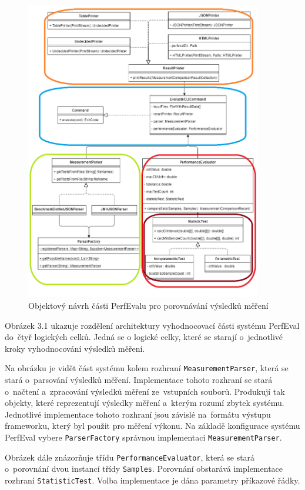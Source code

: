 \begin{figure}[!ht]
    \centering
    \includegraphics[width=0.92\textwidth]{../img/perfeval_evaluate_rect.png}
    \caption{Objektový návrh části PerfEvalu pro porovnávání výsledků měření}
\end{figure}

Obrázek 3.1 ukazuje rozdělení architektury vyhodnocovací části systému PerfEval do~čtyř logických celků.
Jedná se o logické celky, které se starají o~jednotlivé kroky vyhodnocování výsledků měření.

Na obrázku je vidět část systému kolem rozhraní \lstinline|MeasurementParser|, která se stará o~parsování výsledků měření.
Implementace tohoto rozhraní se stará o~načtení a~zpracování výsledků měření ze~vstupních souborů.
Produkují tak objekty, které reprezentují výsledky měření a~kterým rozumí zbytek systému.
Jednotlivé implementace tohoto rozhraní jsou závislé na~formátu výstupu frameworku, který byl použit pro měření výkonu.
Na základě konfigurace systému PerfEval vybere \lstinline|ParserFactory| správnou implementaci \lstinline|MeasurementParser|.

Obrázek dále znázorňuje třídu \lstinline|PerformanceEvaluator|, která se stará o~porovnání dvou instancí třídy \lstinline|Samples|.
Porovnání obstarává implementace rozhraní \lstinline|StatisticTest|. Volba implementace je dána parametry příkazové řádky.

